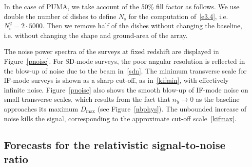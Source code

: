 In the case of PUMA, we take account of the 50\% fill factor as follows. We use double the number of dishes to define $N_\mathrm{s}$ for the computation of~\eqref{e3.4}, i.e. $N_\mathrm{s}^2= 2\cdot 5000$. Then  we  remove half of the dishes without changing the baseline, i.e. without changing the shape and ground-area of the array.

The noise power spectra of the surveys at fixed redshift are displayed in Figure~\ref{pnoise}. For SD-mode surveys, the poor angular resolution is reflected in the blow-up of noise due to the beam in~\eqref{sdn}.
The minimum transverse scale for IF-mode surveys  is shown as a sharp cut-off, as in~\eqref{kifmin}, with effectively infinite noise.
Figure~\ref{pnoise} also shows the smooth blow-up of IF-mode noise on small transverse scales, which results  from the fact that 
$n_\mathrm{b}\to 0$ as the baseline approaches its maximum $D_\mathrm{max}$ (see Figure~\ref{nbphys}). The unbounded increase of noise kills the signal, corresponding to the approximate cut-off scale~\eqref{kifmax}.

\subsection{Forecasts for the relativistic signal-to-noise ratio}
